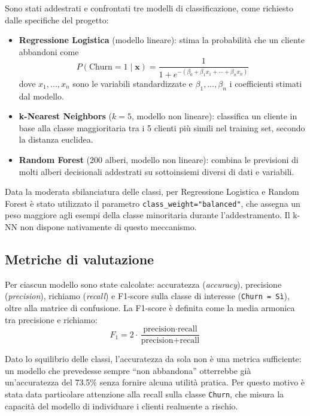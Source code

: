 \documentclass[11pt,a4paper]{article}
\begin{document}
Sono stati addestrati e confrontati tre modelli di classificazione, come richiesto dalle specifiche del progetto:

\begin{itemize}
    \item \textbf{Regressione Logistica} (modello lineare): stima la probabilit\`a che un cliente abbandoni come
    \begin{equation}
        P(\text{Churn} = 1 \mid \mathbf{x}) = \frac{1}{1 + e^{-(\beta_0 + \beta_1 x_1 + \cdots + \beta_n x_n)}}
        \label{eq:logistic}
    \end{equation}
    dove $x_1, \ldots, x_n$ sono le variabili standardizzate e $\beta_1, \ldots, \beta_n$ i coefficienti stimati dal modello.
    \item \textbf{k-Nearest Neighbors} ($k=5$, modello non lineare): classifica un cliente in base alla classe maggioritaria tra i 5 clienti pi\`u simili nel training set, secondo la distanza euclidea.
    \item \textbf{Random Forest} (200 alberi, modello non lineare): combina le previsioni di molti alberi decisionali addestrati su sottoinsiemi diversi di dati e variabili.
\end{itemize}

Data la moderata sbilanciatura delle classi, per Regressione Logistica e Random Forest \`e stato utilizzato il parametro \texttt{class\_weight="balanced"}, che assegna un peso maggiore agli esempi della classe minoritaria durante l'addestramento. Il k-NN non dispone nativamente di questo meccanismo.

\subsection{Metriche di valutazione}

Per ciascun modello sono state calcolate: accuratezza (\emph{accuracy}), precisione (\emph{precision}), richiamo (\emph{recall}) e F1-score sulla classe di interesse (\texttt{Churn = S\`i}), oltre alla matrice di confusione. La F1-score \`e definita come la media armonica tra precisione e richiamo:
\begin{equation}
    F_1 = 2 \cdot \frac{\text{precision} \cdot \text{recall}}{\text{precision} + \text{recall}}
    \label{eq:f1}
\end{equation}

Dato lo squilibrio delle classi, l'accuratezza da sola non \`e una metrica sufficiente: un modello che prevedesse sempre ``non abbandona'' otterrebbe gi\`a un'accuratezza del 73.5\% senza fornire alcuna utilit\`a pratica. Per questo motivo \`e stata data particolare attenzione alla recall sulla classe \texttt{Churn}, che misura la capacit\`a del modello di individuare i clienti realmente a rischio.
\end{document}

